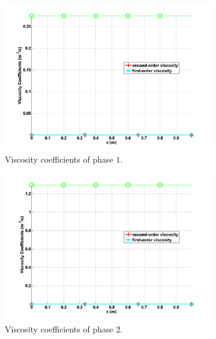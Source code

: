 %
\begin{figure}[H]
        \centering
        \begin{subfigure}[b]{0.495\textwidth}
                \centering
                \includegraphics[width=\textwidth]{figures/liquid_viscosity.png}
                \caption{Viscosity coefficients of phase $1$.}
                \label{vel-vap-7-eqn-sect4}
        \end{subfigure}%
        \begin{subfigure}[b]{0.495\textwidth}
                \centering
                \includegraphics[width=\textwidth]{figures/vapor_viscosity.png}
                \caption{Viscosity coefficients of phase $2$.}
                \label{vel-vap-7-eqn-sect4}
        \end{subfigure}
        \caption{\label{fig:inlet_sct3}}
\end{figure}
%
